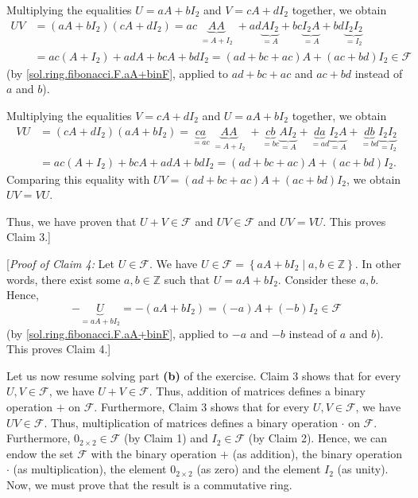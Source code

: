 \documentclass[paper=a4, fontsize=12pt]{scrartcl}%
\theoremstyle{plainsl}
\theoremstyle{definition}
\theoremstyle{remark}
\begin{document}
Multiplying the equalities $U=aA+bI_{2}$ and $V=cA+dI_{2}$ together, we obtain%
\begin{align*}
UV  &  =\left(  aA+bI_{2}\right)  \left(  cA+dI_{2}\right)  =ac\underbrace{AA}%
_{\substack{=A+I_{2}}}+ad\underbrace{AI_{2}}_{=A}+bc\underbrace{I_{2}A}%
_{=A}+bd\underbrace{I_{2}I_{2}}_{=I_{2}}\\
&  =ac\left(  A+I_{2}\right)  +adA+bcA+bdI_{2}=\left(  ad+bc+ac\right)
A+\left(  ac+bd\right)  I_{2}\in\mathcal{F}%
\end{align*}
(by \eqref{sol.ring.fibonacci.F.aA+binF}, applied to $ad+bc+ac$ and $ac+bd$
instead of $a$ and $b$).

Multiplying the equalities $V=cA+dI_{2}$ and $U=aA+bI_{2}$ together, we obtain%
\begin{align*}
VU  &  =\left(  cA+dI_{2}\right)  \left(  aA+bI_{2}\right)  =\underbrace{ca}%
_{=ac}\underbrace{AA}_{\substack{=A+I_{2}}}+\underbrace{cb}_{=bc}%
\underbrace{AI_{2}}_{=A}+\underbrace{da}_{=ad}\underbrace{I_{2}A}%
_{=A}+\underbrace{db}_{=bd}\underbrace{I_{2}I_{2}}_{=I_{2}}\\
&  =ac\left(  A+I_{2}\right)  +bcA+adA+bdI_{2}=\left(  ad+bc+ac\right)
A+\left(  ac+bd\right)  I_{2}.
\end{align*}
Comparing this equality with $UV=\left(  ad+bc+ac\right)  A+\left(
ac+bd\right)  I_{2}$, we obtain $UV=VU$.

Thus, we have proven that $U+V\in\mathcal{F}$ and $UV\in\mathcal{F}$ and
$UV=VU$. This proves Claim 3.]

[\textit{Proof of Claim 4:} Let $U\in\mathcal{F}$. We have $U\in
\mathcal{F}=\left\{  aA+bI_{2}\mid a,b\in\mathbb{Z}\right\}  $. In other
words, there exist some $a,b\in\mathbb{Z}$ such that $U=aA+bI_{2}$. Consider
these $a,b$. Hence,%
\[
-\underbrace{U}_{=aA+bI_{2}}=-\left(  aA+bI_{2}\right)  =\left(  -a\right)
A+\left(  -b\right)  I_{2}\in\mathcal{F}%
\]
(by \eqref{sol.ring.fibonacci.F.aA+binF}, applied to $-a$ and $-b$ instead of
$a$ and $b$). This proves Claim 4.]

Let us now resume solving part \textbf{(b)} of the exercise. Claim 3 shows
that for every $U,V\in\mathcal{F}$, we have $U+V\in\mathcal{F}$. Thus,
addition of matrices defines a binary operation $+$ on $\mathcal{F}$.
Furthermore, Claim 3 shows that for every $U,V\in\mathcal{F}$, we have
$UV\in\mathcal{F}$. Thus, multiplication of matrices defines a binary
operation $\cdot$ on $\mathcal{F}$. Furthermore, $0_{2\times2}\in\mathcal{F}$
(by Claim 1) and $I_{2}\in\mathcal{F}$ (by Claim 2). Hence, we can endow the
set $\mathcal{F}$ with the binary operation $+$ (as addition), the binary
operation $\cdot$ (as multiplication), the element $0_{2\times2}$ (as zero)
and the element $I_{2}$ (as unity). Now, we must prove that the result is a
commutative ring.
\end{document}
